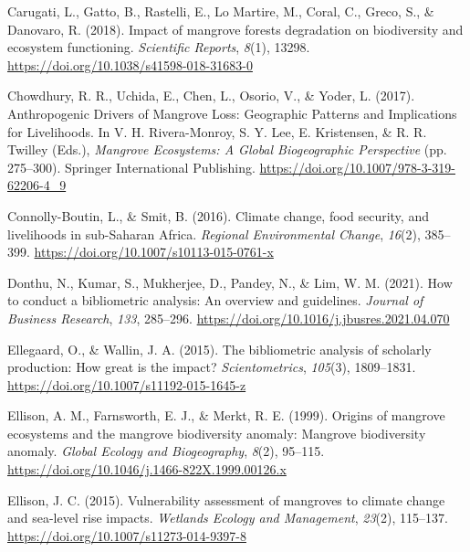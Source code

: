 \documentclass[
  12pt,
]{article}
\newlength{\cslhangindent}
\newenvironment{CSLReferences}[2] %
 {\begin{list}{}{%
  \setlength{\itemindent}{0pt}
  \setlength{\leftmargin}{0pt}
  \setlength{\parsep}{0pt}
  \ifodd #1
   \setlength{\leftmargin}{\cslhangindent}
   \setlength{\itemindent}{-1\cslhangindent}
  \fi
  \setlength{\itemsep}{#2\baselineskip}}}
 {\end{list}}
\begin{document}
\begin{CSLReferences}{1}{2}
Carugati, L., Gatto, B., Rastelli, E., Lo Martire, M., Coral, C., Greco, S., \& Danovaro, R. (2018). Impact of mangrove forests degradation on biodiversity and ecosystem functioning. \emph{Scientific Reports}, \emph{8}(1), 13298. \url{https://doi.org/10.1038/s41598-018-31683-0}

Chowdhury, R. R., Uchida, E., Chen, L., Osorio, V., \& Yoder, L. (2017). Anthropogenic {Drivers} of {Mangrove Loss}: {Geographic Patterns} and {Implications} for {Livelihoods}. In V. H. Rivera-Monroy, S. Y. Lee, E. Kristensen, \& R. R. Twilley (Eds.), \emph{Mangrove {Ecosystems}: {A Global Biogeographic Perspective}} (pp. 275--300). Springer International Publishing. \url{https://doi.org/10.1007/978-3-319-62206-4_9}

Connolly-Boutin, L., \& Smit, B. (2016). Climate change, food security, and livelihoods in sub-{Saharan Africa}. \emph{Regional Environmental Change}, \emph{16}(2), 385--399. \url{https://doi.org/10.1007/s10113-015-0761-x}

Donthu, N., Kumar, S., Mukherjee, D., Pandey, N., \& Lim, W. M. (2021). How to conduct a bibliometric analysis: {An} overview and guidelines. \emph{Journal of Business Research}, \emph{133}, 285--296. \url{https://doi.org/10.1016/j.jbusres.2021.04.070}

Ellegaard, O., \& Wallin, J. A. (2015). The bibliometric analysis of scholarly production: {How} great is the impact? \emph{Scientometrics}, \emph{105}(3), 1809--1831. \url{https://doi.org/10.1007/s11192-015-1645-z}

Ellison, A. M., Farnsworth, E. J., \& Merkt, R. E. (1999). Origins of mangrove ecosystems and the mangrove biodiversity anomaly: {Mangrove} biodiversity anomaly. \emph{Global Ecology and Biogeography}, \emph{8}(2), 95--115. \url{https://doi.org/10.1046/j.1466-822X.1999.00126.x}

Ellison, J. C. (2015). Vulnerability assessment of mangroves to climate change and sea-level rise impacts. \emph{Wetlands Ecology and Management}, \emph{23}(2), 115--137. \url{https://doi.org/10.1007/s11273-014-9397-8}


\end{CSLReferences}
\end{document}
